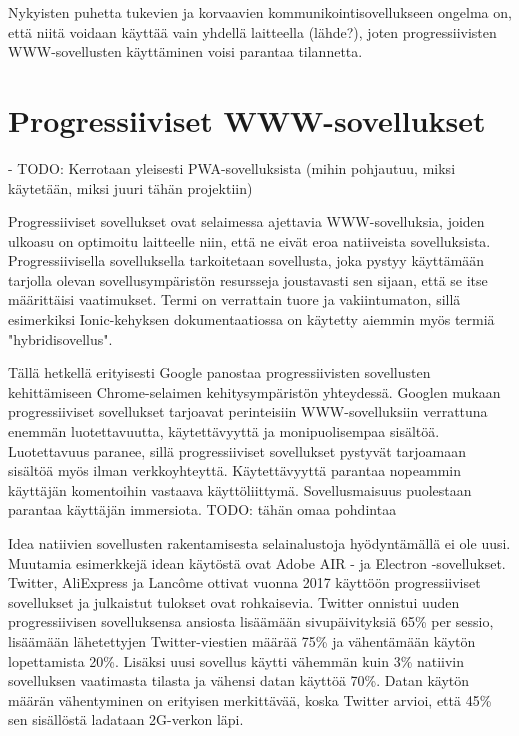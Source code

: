 \documentclass[utf8]{gradu3}
\begin{document}
Nykyisten puhetta tukevien ja korvaavien kommunikointisovellukseen ongelma on, että niitä voidaan käyttää vain yhdellä laitteella (lähde?), joten progressiivisten WWW-sovellusten käyttäminen voisi parantaa tilannetta.

\section{Progressiiviset WWW-sovellukset}

- TODO: Kerrotaan yleisesti PWA-sovelluksista (mihin pohjautuu, miksi käytetään, miksi juuri tähän projektiin)

Progressiiviset sovellukset ovat selaimessa ajettavia WWW-sovelluksia, joiden ulkoasu on optimoitu laitteelle niin, että ne eivät eroa natiiveista sovelluksista. Progressiivisella sovelluksella tarkoitetaan sovellusta, joka pystyy käyttämään tarjolla olevan sovellusympäristön resursseja joustavasti sen sijaan, että se itse määrittäisi vaatimukset. Termi on verrattain tuore ja vakiintumaton, sillä esimerkiksi Ionic-kehyksen dokumentaatiossa on käytetty aiemmin myös termiä "hybridisovellus".

Tällä hetkellä erityisesti Google panostaa progressiivisten sovellusten kehittämiseen Chrome-selaimen kehitysympäristön yhteydessä. Googlen mukaan progressiiviset sovellukset tarjoavat perinteisiin WWW-sovelluksiin verrattuna enemmän luotettavuutta, käytettävyyttä ja monipuolisempaa sisältöä. Luotettavuus paranee, sillä progressiiviset sovellukset pystyvät tarjoamaan sisältöä myös ilman verkkoyhteyttä. Käytettävyyttä parantaa nopeammin käyttäjän komentoihin vastaava käyttöliittymä. Sovellusmaisuus puolestaan parantaa käyttäjän immersiota. \parencite[]{google-pwa-marketing}
TODO: tähän omaa pohdintaa

Idea natiivien sovellusten rakentamisesta selainalustoja hyödyntämällä ei ole uusi. Muutamia esimerkkejä idean käytöstä ovat Adobe AIR - ja Electron -sovellukset. Twitter, AliExpress ja Lancôme ottivat vuonna 2017 käyttöön progressiiviset sovellukset ja julkaistut tulokset ovat rohkaisevia. Twitter onnistui uuden progressiivisen sovelluksensa ansiosta lisäämään sivupäivityksiä 65\% per sessio, lisäämään lähetettyjen Twitter-viestien määrää 75\% ja vähentämään käytön lopettamista 20\%. Lisäksi uusi sovellus käytti vähemmän kuin 3\% natiivin sovelluksen vaatimasta tilasta ja vähensi datan käyttöä 70\%. Datan käytön määrän vähentyminen on erityisen merkittävää, koska Twitter arvioi, että 45\% sen sisällöstä ladataan 2G-verkon läpi. \parencite[]{beginners-guide-pwa}
\end{document}
